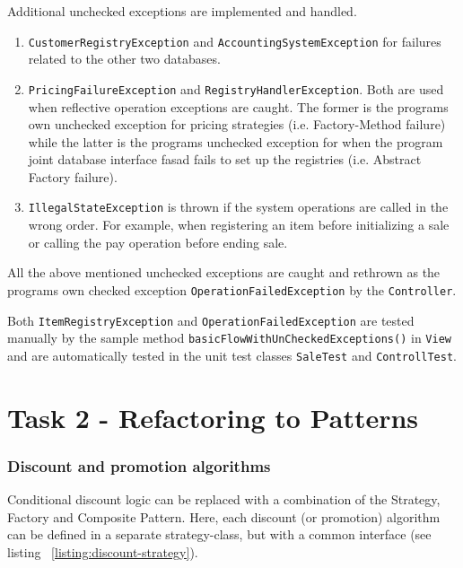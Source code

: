 \documentclass[a4paper]{scrreprt}
\begin{document}
Additional unchecked exceptions are implemented and handled.
\begin{enumerate}
    \item \texttt{CustomerRegistryException} and \texttt{AccountingSystemException} for
    failures related to the other two databases.
    \item \texttt{PricingFailureException} and \texttt{RegistryHandlerException}.
    Both are used when reflective operation exceptions are caught.
    The former is the programs own unchecked exception for pricing strategies
    (i.e. Factory-Method failure) while the latter
    is the programs unchecked exception for
    when the program joint database interface fasad fails to set up the registries
    (i.e. Abstract Factory failure).
    \item \texttt{IllegalStateException} is thrown if the
    system operations are called in the wrong order.
    For example, when registering an item before initializing a sale
    or calling the pay operation before ending sale.
\end{enumerate}

All the above mentioned unchecked exceptions %
are caught and rethrown as the programs own checked
exception \texttt{OperationFailedException}
by the \verb|Controller|.

Both \texttt{ItemRegistryException} and \texttt{OperationFailedException}
are tested manually
by the sample method \texttt{basicFlowWithUnCheckedExceptions()}
in \verb|View| and are automatically tested in the unit test
classes \verb|SaleTest| and \verb|ControllTest|.




\section*{Task 2 - Refactoring to Patterns}

\subsubsection{Discount and promotion algorithms}
Conditional discount logic can be replaced with a combination of the Strategy, Factory and Composite Pattern.
Here, each discount (or promotion) algorithm
can be defined in a separate strategy-class, but with a common interface
(see listing ~\ref{listing:discount-strategy}).
\end{document}
